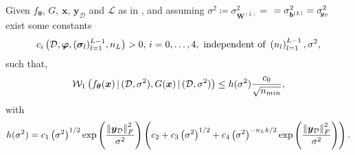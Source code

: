 \begin{corollary} \label{cor:convposteriorsigma}
	Given $f_{\bm{\theta}}$, $G$, $\bm{x}$, $\bm{y}_{\mathcal{D}}$ and $\mathcal{L}$ as in , and assuming $\sigma^2 \coloneqq \sigma_{\bm{W}^{(L)}}^2 =$ $= \sigma_{\bm{b}^{(L)}}^2 = \sigmay^2$ exist some constants
	\begin{equation*}
		c_i\left(\train, \bm{\varphi}, (\bm{\sigma}_l)_{l = 1}^{L - 1}, n_L\right) > 0, \,i = 0, \dots, 4, \text{ independent of } \left(n_l\right)_{l = 1}^{L - 1}, \sigma^2,
	\end{equation*}
	such that,
	\begin{equation*}
		\wass[1]{f_{\bm{\theta}}(\bm{x}) \given (\train, \sigma^2)}{G(\bm{x}) \given (\train, \sigma^2)} \leq h(\sigma^2) \frac{c_0}{\sqrt{n_{min}}},
	\end{equation*}
	with
	\begin{equation*}
		h(\sigma^2) = c_1 \left(\sigma^2\right)^{1/2} \exp{\frac{\norm{\bm{y}_{\mathcal{D}}}_F^2}{\sigma^2}} \left(c_2 + c_3 \left(\sigma^2\right)^{1/2} + c_4 \left(\sigma^2\right)^{- n_L k / 2} \exp{\frac{\norm{\bm{y}_{\mathcal{D}}}_F^2}{\sigma^2}}\right).
	\end{equation*}
\end{corollary}
